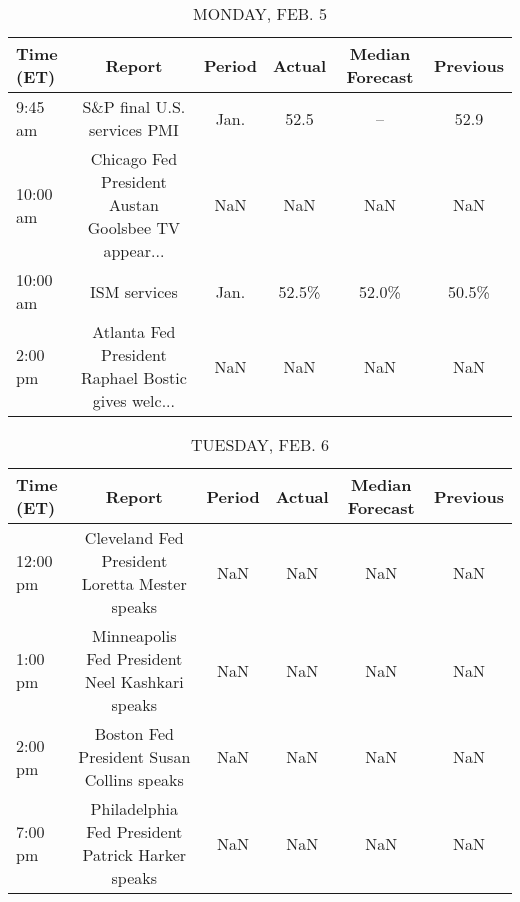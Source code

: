 \documentclass{article}%
\begin{document}
%
\normalsize%


\begin{table}[htbp]%
\caption{MONDAY, FEB. 5}%
\centering%
\begin{adjustbox}{width=1\textwidth}%
\begin{tabular}{lccccc}
\toprule
Time (ET) &                                             Report & Period & Actual & Median Forecast & Previous \\
\midrule
  9:45 am &                        S\&P final U.S. services PMI &   Jan. &   52.5 &              -- &     52.9 \\
 10:00 am & Chicago Fed President Austan Goolsbee TV appear... &    NaN &    NaN &             NaN &      NaN \\
 10:00 am &                                       ISM services &   Jan. &  52.5\% &           52.0\% &    50.5\% \\
  2:00 pm & Atlanta Fed President Raphael Bostic gives welc... &    NaN &    NaN &             NaN &      NaN \\
\bottomrule
\end{tabular}
%
\end{adjustbox}%
\end{table}

%


\begin{table}[htbp]%
\caption{TUESDAY, FEB. 6}%
\centering%
\begin{adjustbox}{width=1\textwidth}%
\begin{tabular}{lccccc}
\toprule
Time (ET) &                                           Report & Period & Actual & Median Forecast & Previous \\
\midrule
 12:00 pm &    Cleveland Fed President Loretta Mester speaks &    NaN &    NaN &             NaN &      NaN \\
  1:00 pm &   Minneapolis Fed President Neel Kashkari speaks &    NaN &    NaN &             NaN &      NaN \\
  2:00 pm &        Boston Fed President Susan Collins speaks &    NaN &    NaN &             NaN &      NaN \\
  7:00 pm & Philadelphia Fed President Patrick Harker speaks &    NaN &    NaN &             NaN &      NaN \\
\bottomrule
\end{tabular}
%
\end{adjustbox}%
\end{table}

%
\end{document}
